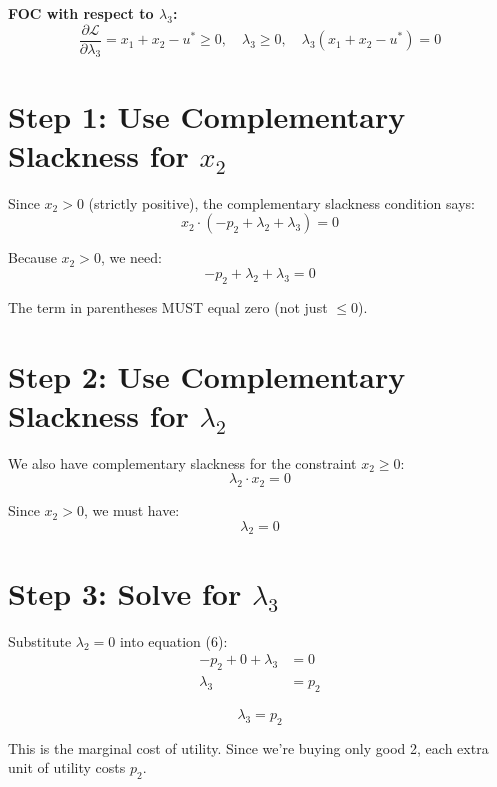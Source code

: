 \documentclass[11pt]{article}
\begin{document}
\textbf{FOC with respect to $\lambda_3$:}
\begin{equation}
\frac{\partial \mathcal{L}}{\partial \lambda_3} = x_1 + x_2 - u^* \geq 0, \quad \lambda_3 \geq 0, \quad \lambda_3(x_1 + x_2 - u^*) = 0
\end{equation}

\section{Step 1: Use Complementary Slackness for $x_2$}

Since $x_2 > 0$ (strictly positive), the complementary slackness condition says:
\begin{equation}
x_2 \cdot (-p_2 + \lambda_2 + \lambda_3) = 0
\end{equation}

Because $x_2 > 0$, we need:
\begin{equation}
-p_2 + \lambda_2 + \lambda_3 = 0
\end{equation}

The term in parentheses MUST equal zero (not just $\leq 0$).

\section{Step 2: Use Complementary Slackness for $\lambda_2$}

We also have complementary slackness for the constraint $x_2 \geq 0$:
\begin{equation}
\lambda_2 \cdot x_2 = 0
\end{equation}

Since $x_2 > 0$, we must have:
\begin{equation}
\lambda_2 = 0
\end{equation}

\section{Step 3: Solve for $\lambda_3$}

Substitute $\lambda_2 = 0$ into equation (6):
\begin{align}
-p_2 + 0 + \lambda_3 &= 0 \\
\lambda_3 &= p_2
\end{align}

\begin{tcolorbox}[colback=green!5!white,colframe=green!75!black,title=Key Result]
$$\lambda_3 = p_2$$

This is the marginal cost of utility. Since we're buying only good 2, each extra unit of utility costs $p_2$.
\end{tcolorbox}
\end{document}
